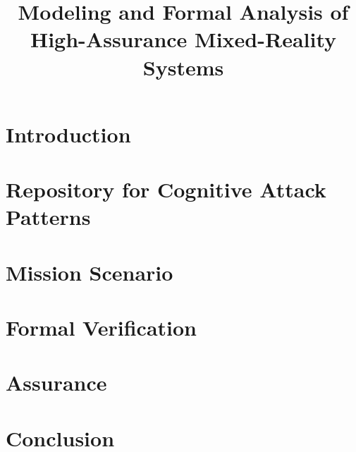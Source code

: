 \documentclass[conference]{IEEEtran}
\begin{document}
\title{Modeling and Formal Analysis of High-Assurance Mixed-Reality Systems}



\maketitle




\section{Introduction}
\label{sec:introduction}


\section{Repository for Cognitive Attack Patterns}
\label{sec:recap}


\section{Mission Scenario}
\label{sec:mission}


\section{Formal Verification}
\label{sec:verification}


\section{Assurance}
\label{sec:assurance}


\section{Conclusion}
\label{sec:conclusion}




%
\end{document}
